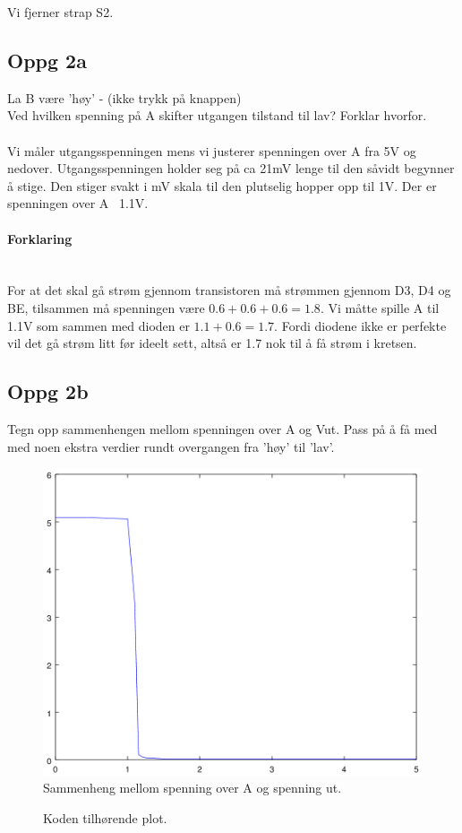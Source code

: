 Vi fjerner strap S2.

\subsection{Oppg 2a}
La B være ’høy’ - (ikke trykk på knappen) \\
Ved hvilken spenning på A skifter utgangen tilstand til lav? Forklar hvorfor.
\\\\
Vi måler utgangsspenningen mens vi justerer spenningen over A fra 5V og nedover.
Utgangsspenningen holder seg på ca 21mV lenge til den såvidt begynner å stige.
Den stiger svakt i mV skala til den plutselig hopper opp til 1V.
Der er spenningen over A ~1.1V.

\paragraph{Forklaring} \mbox{} \\
For at det skal gå strøm gjennom transistoren må strømmen gjennom D3, D4 og BE,
tilsammen må spenningen være $0.6 + 0.6 + 0.6 = 1.8$.
Vi måtte spille A til 1.1V som sammen med dioden er $1.1 + 0.6 = 1.7$.
Fordi diodene ikke er perfekte vil det gå strøm litt før ideelt sett,
altså er 1.7 nok til å få strøm i kretsen.



\subsection{Oppg 2b}
Tegn opp sammenhengen mellom spenningen over A og 
Vut.  
Pass på å få med med noen ekstra verdier rundt overgangen 
fra ’høy’ til ’lav’.
\begin{figure}[!ht]
  \caption{Sammenheng mellom spenning over A og spenning ut.}
  \centering
    \includegraphics[width=\textwidth]{2b.png}
\end{figure}

\begin{figure}[!ht]
  
  \caption{Koden tilhørende plot.}
\end{figure}
